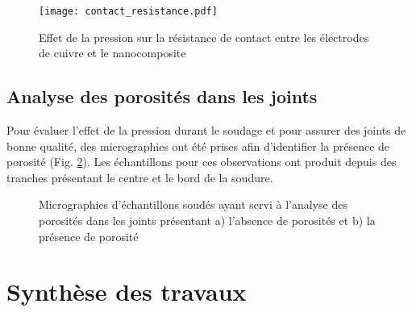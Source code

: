 \begin{figure}[h]
	\centering
	\texttt{[image: contact\_resistance.pdf]}
	\caption{Effet de la pression sur la résistance de contact entre les électrodes de cuivre et le nanocomposite}
	\label{fig:resistance_contact}
\end{figure}

\FloatBarrier
\subsection{Analyse des porosités dans les joints}

Pour évaluer l'effet de la pression durant le soudage et pour assurer des joints de bonne qualité, des micrographies ont été prises afin d'identifier la présence de porosité (Fig. \ref{fig:micro_analyse_porosite}). 
Les échantillons pour ces observations ont produit depuis des tranches présentant le centre et le bord de la soudure. 

\begin{figure}[h!]
	\centering
	 \qquad
	\caption{Micrographies d'échantillons soudés ayant servi à l'analyse des porosités dans les joints présentant a) l'absence de porosités et b) la présence de porosité}
	\label{fig:micro_analyse_porosite}
\end{figure}

\FloatBarrier
\section{Synthèse des travaux}

%

